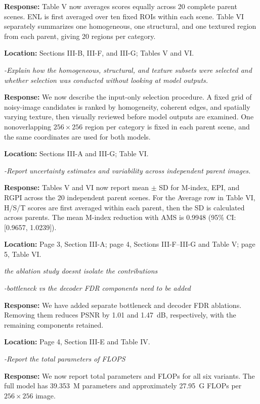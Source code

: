 \documentclass[11pt,letterpaper]{article}
\newcommand{\reviewgroup}[1]{%
  \Needspace{5\baselineskip}%
  \medskip\textit{#1}\par
}
\begin{document}
\textbf{Response:} Table V now averages scores equally across 20 complete parent scenes. ENL is first averaged over ten fixed ROIs within each scene. Table VI separately summarizes one homogeneous, one structural, and one textured region from each parent, giving 20 regions per category.

\textbf{Location:} Sections III-B, III-F, and III-G; Tables V and VI.

\textit{-Explain how the homogeneous, structural, and texture subsets were selected and whether selection was conducted without looking at model outputs.}

\textbf{Response:} We now describe the input-only selection procedure. A fixed grid of noisy-image candidates is ranked by homogeneity, coherent edges, and spatially varying texture, then visually reviewed before model outputs are examined. One nonoverlapping \(256\times256\) region per category is fixed in each parent scene, and the same coordinates are used for both models.

\textbf{Location:} Sections III-A and III-G; Table VI.

\textit{-Report uncertainty estimates and variability across independent parent images.}

\textbf{Response:} Tables V and VI now report mean $\pm$ SD for M-index, EPI, and RGPI across the 20 independent parent scenes. For the Average row in Table VI, H/S/T scores are first averaged within each parent, then the SD is calculated across parents. The mean M-index reduction with AMS is 0.9948 (95\% CI: [0.9657, 1.0239]).

\textbf{Location:} Page 3, Section III-A; page 4, Sections III-F--III-G and Table V; page 5, Table VI.

\reviewgroup{the ablation study doesn\textquotesingle{}t isolate the contributions}

\textit{-bottleneck vs the decoder FDR components need to be added}

\textbf{Response:} We have added separate bottleneck and decoder FDR ablations. Removing them reduces PSNR by 1.01 and 1.47~dB, respectively, with the remaining components retained.

\textbf{Location:} Page 4, Section III-E and Table IV.

\textit{-Report the total parameters of FLOPS}

\textbf{Response:} We now report total parameters and FLOPs for all six variants. The full model has 39.353~M parameters and approximately 27.95~G FLOPs per \(256\times256\) image.
\end{document}
